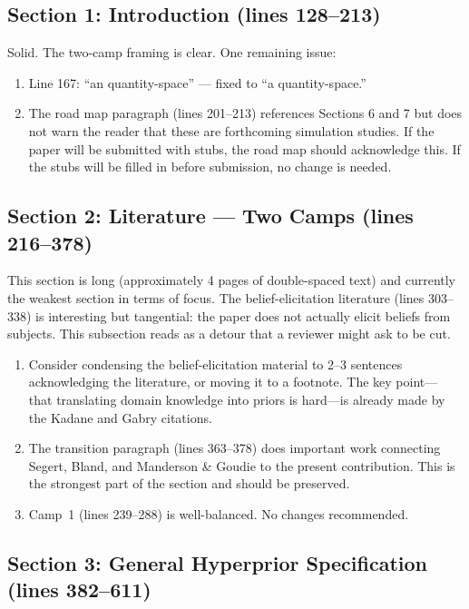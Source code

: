 \documentclass[12pt,a4paper]{article}
\begin{document}
\subsection{Section 1: Introduction (lines 128--213)}

Solid. The two-camp framing is clear. One remaining issue:

\begin{enumerate}[label=(\alph*)]
  \item[{[x]}] Line 167: ``an quantity-space'' --- fixed to ``a quantity-space.''
  \item The road map paragraph (lines 201--213) references Sections 6 and 7 but
    does not warn the reader that these are forthcoming simulation studies. If
    the paper will be submitted with stubs, the road map should acknowledge
    this. If the stubs will be filled in before submission, no change is needed.
\end{enumerate}


\subsection{Section 2: Literature --- Two Camps (lines 216--378)}

This section is long (approximately 4 pages of double-spaced text) and
currently the weakest section in terms of focus. The belief-elicitation
literature (lines 303--338) is interesting but tangential: the paper does not
actually elicit beliefs from subjects. This subsection reads as a detour that a
reviewer might ask to be cut.

\begin{enumerate}[label=(\alph*)]
  \item Consider condensing the belief-elicitation material to 2--3 sentences
    acknowledging the literature, or moving it to a footnote. The key point---
    that translating domain knowledge into priors is hard---is already made by
    the Kadane and Gabry citations.
  \item The transition paragraph (lines 363--378) does important work connecting
    Segert, Bland, and Manderson \& Goudie to the present contribution. This
    is the strongest part of the section and should be preserved.
  \item Camp~1 (lines 239--288) is well-balanced. No changes recommended.
\end{enumerate}


\subsection{Section 3: General Hyperprior Specification (lines 382--611)}
\end{document}
